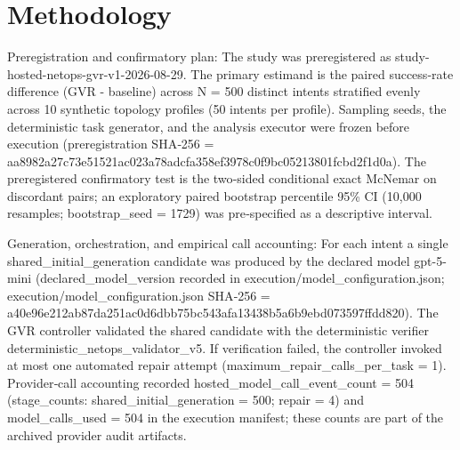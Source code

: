 \documentclass[conference]{IEEEtran}
\begin{document}
\section{Methodology}
Preregistration and confirmatory plan: The study was preregistered as study-hosted-netops-gvr-v1-2026-08-29. The primary estimand is the paired success‑rate difference (GVR - baseline) across N = 500 distinct intents stratified evenly across 10 synthetic topology profiles (50 intents per profile). Sampling seeds, the deterministic task generator, and the analysis executor were frozen before execution (preregistration SHA‑256 = aa8982a2\allowbreak{}7c73e515\allowbreak{}21ac023a\allowbreak{}78adcfa3\allowbreak{}58ef3978\allowbreak{}c0f9bc05\allowbreak{}213801fc\allowbreak{}bd2f1d0a). The preregistered confirmatory test is the two‑sided conditional exact McNemar on discordant pairs; an exploratory paired bootstrap percentile 95\% CI (10,000 resamples; bootstrap\_seed = 1729) was pre‑specified as a descriptive interval.

Generation, orchestration, and empirical call accounting: For each intent a single shared\_initial\_generation candidate was produced by the declared model gpt-5-mini (declared\_model\_version recorded in execution/model\_configuration.json; execution/model\_configuration.json SHA‑256 = a40e96e2\allowbreak{}12ab87da\allowbreak{}251ac0d6\allowbreak{}dbb75bc5\allowbreak{}43afa134\allowbreak{}38b5a6b9\allowbreak{}ebd07359\allowbreak{}7ffdd820). The GVR controller validated the shared candidate with the deterministic verifier deterministic\_netops\_validator\_v5. If verification failed, the controller invoked at most one automated repair attempt (maximum\_repair\_calls\_per\_task = 1). Provider‑call accounting recorded hosted\_model\_call\_event\_count = 504 (stage\_counts: shared\_initial\_generation = 500; repair = 4) and model\_calls\_used = 504 in the execution manifest; these counts are part of the archived provider audit artifacts.
\end{document}
